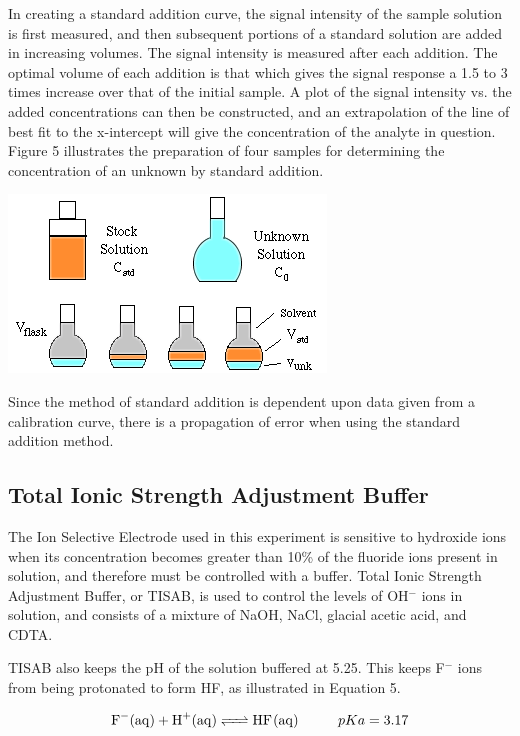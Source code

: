 \documentclass{article}
\begin{document}
In creating a standard addition curve, the signal intensity of the sample
solution is first measured, and then subsequent portions of a standard solution
are added in increasing volumes. The signal intensity is measured after each addition.
The optimal volume of each addition is that which gives the signal response a 1.5 to 3 times increase over
that of the initial sample. \cite{aviv}
A plot of the signal intensity vs. the added concentrations can then be constructed, and an extrapolation of
the line of best fit to the x-intercept will give the concentration of the analyte in question.
Figure 5 illustrates the preparation of four samples for determining the concentration of an unknown by standard
addition.\cite{zellmer}
\begin{center}
    \includegraphics[scale=0.6]{stdadd}
\end{center}
Since the method of standard addition is dependent upon data given from a
calibration curve, there is a propagation of error when using the standard addition
method.

\subsection {Total Ionic Strength Adjustment Buffer}
The Ion Selective Electrode used in this experiment is sensitive to hydroxide
ions when its concentration becomes greater than 10\% of the fluoride ions
present in solution, and therefore must be controlled with a buffer.\cite{nmt} 
Total Ionic Strength Adjustment Buffer, or TISAB, is used to control the levels of OH$^-$
ions in solution, and consists of a mixture of NaOH, NaCl, glacial acetic acid,
and CDTA.

TISAB also keeps the pH of the solution buffered at 5.25.\cite{nmt} This keeps
F$^-$ ions from being protonated to form HF, as illustrated in Equation 5.
\begin{center}
    \begin{equation}
        \ce {F-(aq) + H+(aq) <=> HF(aq)} \hspace{1cm} pKa = 3.17
    \end{equation}
\end{center}
\end{document}
